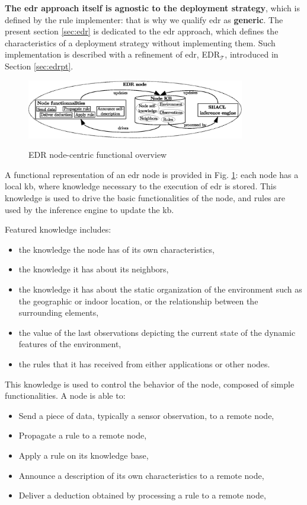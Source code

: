 \documentclass{iosart2c}
\newcommand{\edrt}{EDR$_{\mathcal{T}}$\xspace}
\begin{document}
\textbf{The \gls{edr} approach itself is agnostic to the deployment strategy}, which is defined by the rule implementer: that is why we qualify \gls{edr} as \textbf{generic}. 
The present section \textsection \ref{sec:edr} is dedicated to the \gls{edr} approach, which defines the characteristics of a deployment strategy without implementing them.
Such implementation is described with a refinement of \gls{edr}, \edrt, introduced in Section \textsection \ref{sec:edrpt}.

\begin{figure}
	\centering
	\caption{EDR node-centric functional overview}
	\includegraphics[width=0.85\textwidth]{figures/overview.eps}
	\label{fig:node_overview}
\end{figure}

A functional representation of an \gls{edr} node is provided in Fig. \ref{fig:node_overview}: each node has a local \gls{kb}, where knowledge necessary to the execution of \gls{edr} is stored.
This knowledge is used to drive the basic functionalities of the node, and rules are used by the inference engine to update the \gls{kb}.

Featured knowledge includes:
\begin{itemize}
	\item the knowledge the node has of its own characteristics,
	\item the knowledge it has about its neighbors,
	\item the knowledge it has about the static organization of the environment such as the geographic or indoor location, or the relationship between the surrounding elements,
	\item the value of the last observations depicting the current state of the dynamic features of the environment,
	\item the rules that it has received from either applications or other nodes.
\end{itemize}

This knowledge is used to control the behavior of the node, composed of simple functionalities.
A node is able to:
\begin{itemize}
	\item Send a piece of data, typically a sensor observation, to a remote node,
	\item Propagate a rule to a remote node,
	\item Apply a rule on its knowledge base,
	\item Announce a description of its own characteristics to a remote node,
	\item Deliver a deduction obtained by processing a rule to a remote node, 
\end{itemize}
\end{document}
